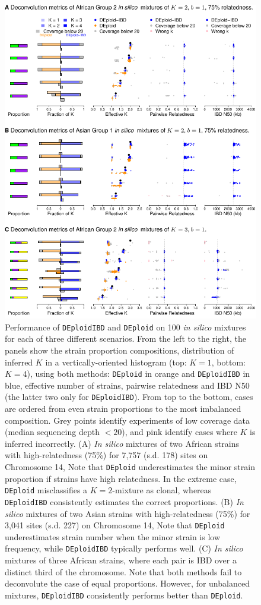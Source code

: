 \documentclass[9pt,lineno]{elife}
\begin{document}
\begin{figure}[htp]
  \begin{center}
  \includegraphics[width=.9\textwidth]{Fig2.pdf}
  \caption{Performance of \texttt{DEploidIBD} and \texttt{DEploid} on 100 {\it in silico} mixtures for each of three different scenarios. From the left to the right, the panels show the strain proportion compositions, distribution of inferred $K$ in a vertically-oriented histogram (top: $K=1$, bottom: $K=4$), using both methods: {\tt DEploid} in orange and {\tt DEploidIBD} in blue, effective number of strains, pairwise relatedness and IBD N50 (the latter two only for {\tt DEploidIBD}). From top to the bottom, cases are ordered from even strain proportions to the most imbalanced composition. Grey points identify experiments of low coverage data (median sequencing depth $<20$), and pink identify cases where $K$ is inferred incorrectly. (A) {\it In silico}  mixtures of two African strains with high-relatedness (75\%) for 7,757 (s.d. 178) sites on Chromosome 14, Note that {\tt DEploid} underestimates the minor strain proportion if strains have high relatedness. In the extreme case, {\tt DEploid} misclassifies a $K=2$-mixture as clonal, whereas {\tt DEploidIBD} consistently estimates the correct proportions. (B)  {\it In silico}  mixtures of two Asian strains with high-relatedness (75\%) for 3,041 sites (s.d. 227) on Chromosome 14, Note that {\tt DEploid} underestimates strain number when the minor strain is low frequency, while  {\tt DEploidIBD} typically performs well. (C)  {\it In silico} mixtures of three African strains, where each pair is IBD over a distinct third of the chromosome. Note that both methods fail to deconvolute the case of equal proportions. However, for unbalanced mixtures, {\tt DEploidIBD} consistently performs better than {\tt DEploid}.
  }\label{fig:benchmark}
  \end{center}


\end{figure}
\end{document}
